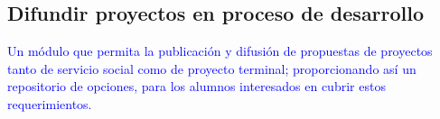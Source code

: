 \documentclass[11pt,letterpaper,titlepage]{article}
\begin{document}



\subsection{Difundir proyectos en proceso de desarrollo}
\textcolor{blue}{
Un m\'odulo que permita la publicaci\'on y difusi\'on de propuestas de proyectos tanto de servicio social como de proyecto terminal; proporcionando as\'i un repositorio de opciones, para los alumnos interesados en cubrir estos requerimientos.}

\end{document}
